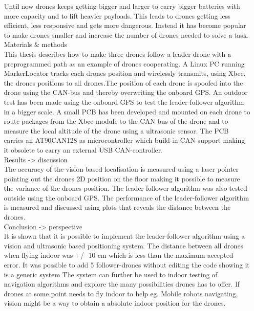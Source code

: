 Until now drones keeps getting bigger and larger to carry bigger batteries with more capacity and to lift heavier payloads. This leads to drones getting less efficient, less responsive and gets more dangerous. Instead it has become popular to make drones smaller and increase the number of drones needed to solve a task. \\

Materials \& methods \\
This thesis describes how to make three drones follow a leader drone with a preprogrammed path as an example of drones cooperating. A Linux PC running MarkerLocator tracks each drones position and wirelessly transmits, using Xbee, the drones positions to all drones.The position of each drone is spoofed into the drone using the CAN-bus and thereby overwriting the onboard GPS. An outdoor test has been made using the onboard GPS to test the leader-follower algorithm in a bigger scale. A small PCB has been developed and mounted on each drone to route packages from the Xbee module to the CAN-bus of the drone and to measure the local altitude of the drone using a ultrasonic sensor. The PCB carries an AT90CAN128 as microcontroller which build-in CAN support making it obsolete to carry an external USB CAN-controller.\\


Results -> discussion\\
The accuracy of the vision based localisation is measured using a laser pointer pointing out the drones 2D position on the floor making it possible to measure the variance of the drones position. The leader-follower algorithm was also tested outside using the onboard GPS. The performance of the leader-follower algorithm is measured and discussed using plots that reveals the distance between the drones.\\

Conclusion -> perspective\\
It is shown that it is possible to implement the leader-follower algorithm using a vision and ultrasonic based positioning system. The distance between all drones when flying indoor was +/- 10 cm which is less than the maximum accepted error. It was possible to add 5 follower-drones without editing the code showing it is a generic system The system can further be used to indoor testing of navigation algorithms and explore the many possibilities drones has to offer. If drones at some point needs to fly indoor to help eg. Mobile robots navigating, vision might be a way to obtain a absolute indoor position for the drones.